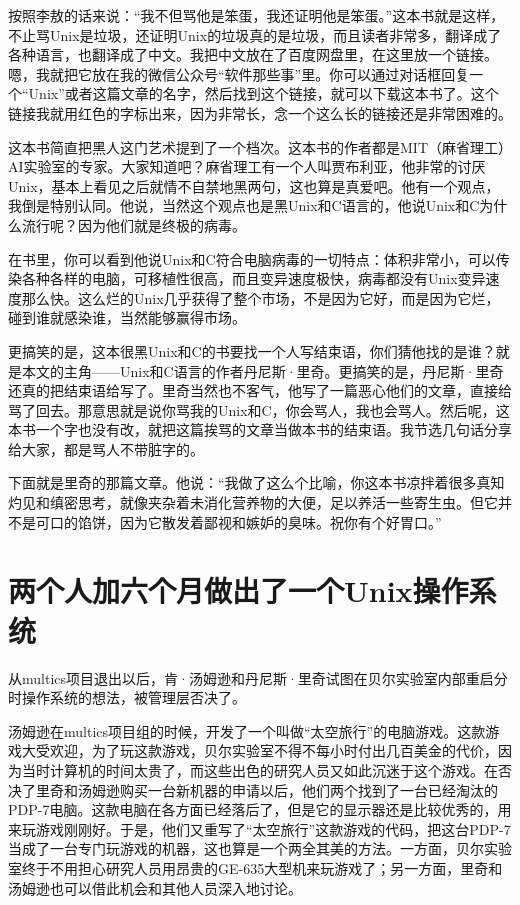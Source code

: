 \documentclass[
  letterpaper,
  DIV=11,
  numbers=noendperiod]{scrreprt}
\begin{document}
按照李敖的话来说：``我不但骂他是笨蛋，我还证明他是笨蛋。''这本书就是这样，不止骂Unix是垃圾，还证明Unix的垃圾真的是垃圾，而且读者非常多，翻译成了各种语言，也翻译成了中文。我把中文放在了百度网盘里，在这里放一个链接。嗯，我就把它放在我的微信公众号``软件那些事''里。你可以通过对话框回复一个``Unix''或者这篇文章的名字，然后找到这个链接，就可以下载这本书了。这个链接我就用红色的字标出来，因为非常长，念一个这么长的链接还是非常困难的。

这本书简直把黑人这门艺术提到了一个档次。这本书的作者都是MIT（麻省理工）AI实验室的专家。大家知道吧？麻省理工有一个人叫贾布利亚，他非常的讨厌Unix，基本上看见之后就情不自禁地黑两句，这也算是真爱吧。他有一个观点，我倒是特别认同。他说，当然这个观点也是黑Unix和C语言的，他说Unix和C为什么流行呢？因为他们就是终极的病毒。

在书里，你可以看到他说Unix和C符合电脑病毒的一切特点：体积非常小，可以传染各种各样的电脑，可移植性很高，而且变异速度极快，病毒都没有Unix变异速度那么快。这么烂的Unix几乎获得了整个市场，不是因为它好，而是因为它烂，碰到谁就感染谁，当然能够赢得市场。

更搞笑的是，这本很黑Unix和C的书要找一个人写结束语，你们猜他找的是谁？就是本文的主角------Unix和C语言的作者丹尼斯·里奇。更搞笑的是，丹尼斯·里奇还真的把结束语给写了。里奇当然也不客气，他写了一篇恶心他们的文章，直接给骂了回去。那意思就是说你骂我的Unix和C，你会骂人，我也会骂人。然后呢，这本书一个字也没有改，就把这篇挨骂的文章当做本书的结束语。我节选几句话分享给大家，都是骂人不带脏字的。

下面就是里奇的那篇文章。他说：``我做了这么个比喻，你这本书凉拌着很多真知灼见和缜密思考，就像夹杂着未消化营养物的大便，足以养活一些寄生虫。但它并不是可口的馅饼，因为它散发着鄙视和嫉妒的臭味。祝你有个好胃口。''


\chapter{两个人加六个月做出了一个Unix操作系统}\label{ux4e24ux4e2aux4ebaux52a0ux516dux4e2aux6708ux505aux51faux4e86ux4e00ux4e2aunixux64cdux4f5cux7cfbux7edf}

从multics项目退出以后，肯·汤姆逊和丹尼斯·里奇试图在贝尔实验室内部重启分时操作系统的想法，被管理层否决了。

汤姆逊在multics项目组的时候，开发了一个叫做``太空旅行''的电脑游戏。这款游戏大受欢迎，为了玩这款游戏，贝尔实验室不得不每小时付出几百美金的代价，因为当时计算机的时间太贵了，而这些出色的研究人员又如此沉迷于这个游戏。在否决了里奇和汤姆逊购买一台新机器的申请以后，他们两个找到了一台已经淘汰的PDP-7电脑。这款电脑在各方面已经落后了，但是它的显示器还是比较优秀的，用来玩游戏刚刚好。于是，他们又重写了``太空旅行''这款游戏的代码，把这台PDP-7当成了一台专门玩游戏的机器，这也算是一个两全其美的方法。一方面，贝尔实验室终于不用担心研究人员用昂贵的GE-635大型机来玩游戏了；另一方面，里奇和汤姆逊也可以借此机会和其他人员深入地讨论。
\end{document}
